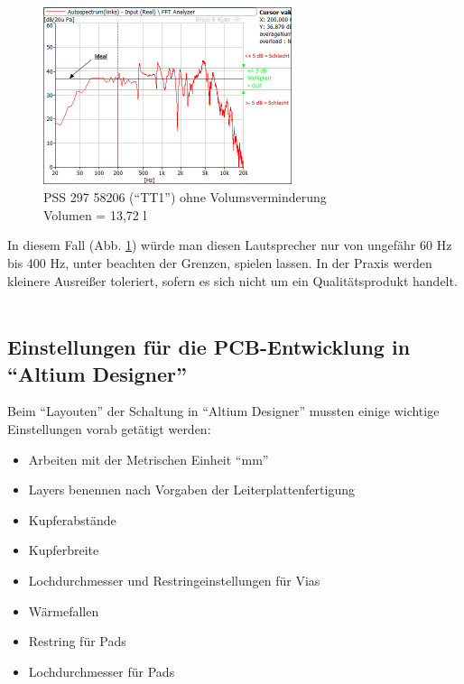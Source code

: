 \begin{figure} [H]
	\centering
	\includegraphics[width=0.65\textwidth]{img/Optimierung/TT/TT1_ohneAllem_welligkeit.png}
	\caption{PSS 297 58206 (\enquote{TT1}) ohne Volumsverminderung \\Volumen = 13,72 l}
	\label{fig:8.6.1}
\end{figure}

In diesem Fall (Abb. \ref{fig:8.6.1}) würde man diesen Lautsprecher nur von ungefähr 60 Hz bis 400 Hz, unter beachten der Grenzen, spielen lassen.
In der Praxis werden kleinere Ausreißer toleriert, sofern es sich nicht um ein Qualitätsprodukt handelt.\\ \\


\subsection{Einstellungen für die PCB-Entwicklung in \enquote{Altium Designer}}\label{subsec:8.1}
Beim \enquote{Layouten} der Schaltung in \enquote{Altium Designer} mussten einige wichtige Einstellungen vorab getätigt werden:
\begin{itemize}
	\item Arbeiten mit der Metrischen Einheit \enquote{mm}
	\item Layers benennen nach Vorgaben der Leiterplattenfertigung
	\item Kupferabstände
	\item Kupferbreite
	\item Lochdurchmesser und Restringeinstellungen für Vias
	\item Wärmefallen
	\item Restring für Pads
	\item Lochdurchmesser für Pads
\end{itemize}

